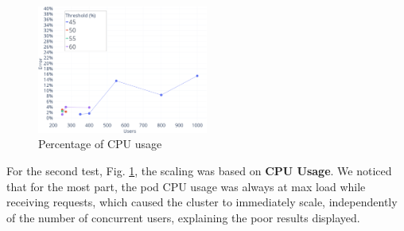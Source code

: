 

\begin{figure}[h]
    \centering
    \includegraphics[width=0.5\textwidth]{Chapters/img/testing/HPA_CpuUsageLeft.png}
    \caption{Percentage of CPU usage}
    \label{fig:metric_cpu}
\end{figure}

For the second test, Fig. \ref{fig:metric_cpu}, the scaling was based on \textbf{CPU Usage}. We noticed that for the most part, the pod CPU usage was always at max load while receiving requests, which caused the cluster to immediately scale, independently of the number of concurrent users, explaining the poor results displayed.


